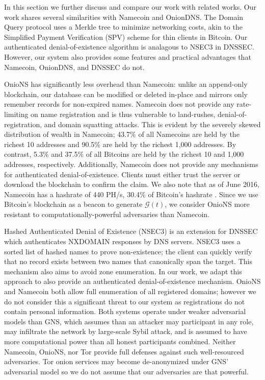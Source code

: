 \documentclass[USenglish,oneside,twocolumn]{article}
\begin{document}
In this section we further discuss and compare our work with related works. Our work shares several similarities with Namecoin and OnionDNS. The Domain Query protocol uses a Merkle tree to minimize networking costs, akin to the Simplified Payment Verification (SPV) scheme \cite{nakamoto2008bitcoin} for thin clients in Bitcoin. Our authenticated denial-of-existence algorithm is analagous to NSEC3 in DNSSEC. However, our system also provides some features and practical advantages that Namecoin, OnionDNS, and DNSSEC do not.

OnioNS has significantly less overhead than Namecoin: unlike an append-only blockchain, our database can be modified or deleted in-place and mirrors only remember records for non-expired names. Namecoin does not provide any rate-limiting on name registration and is thus vulnerable to land-rushes, denial-of-registration, and domain squatting attacks. This is evident by the severely skewed distribution of wealth in Namecoin; 43.7\% of all Namecoins are held by the richest 10 addresses and 90.5\% are held by the richest 1,000 addresses. By contrast, 5.3\% and 37.5\% of all Bitcoins are held by the richest 10 and 1,000 addresses, respectively. \cite{BitInfoCharts} Additionally, Namecoin does not provide any mechanisms for authenticated denial-of-existence. Clients must either trust the server or download the blockchain to confirm the claim. We also note that as of June 2016, Namecoin has a hashrate of 440 PH/s, 30.4\% of Bitcoin's hashrate  \cite{BitInfoCharts}. Since we use Bitcoin's blockchain as a beacon to generate $ \mathcal{G}(t) $, we consider OnioNS more resistant to computationally-powerful adversaries than Namecoin.


Hashed Authenticated Denial of Existence \cite{rfc5155} (NSEC3) is an extension for DNSSEC which authenticates NXDOMAIN responses by DNS servers. NSEC3 uses a sorted list of hashed names to prove non-existence; the client can quickly verify that no record exists between two names that canonically span the target. This mechanism also aims to avoid zone enumeration. In our work, we adapt this approach to also provide an authenticated denial-of-existence mechanism. OnioNS and Namecoin both allow full enumeration of all registered domains; however we do not consider this a significant threat to our system as registrations do not contain personal information. Both systems operate under weaker adversarial models than GNS, which assumes than an attacker may participant in any role, may infiltrate the network by large-scale Sybil attack, and is assumed to have more computational power than all honest participants combined. Neither Namecoin, OnioNS, nor Tor provide full defenses against such well-resourced adversaries. Tor onion services may become de-anonymized under GNS' adversarial model so we do not assume that our adversaries are that powerful.
\end{document}
